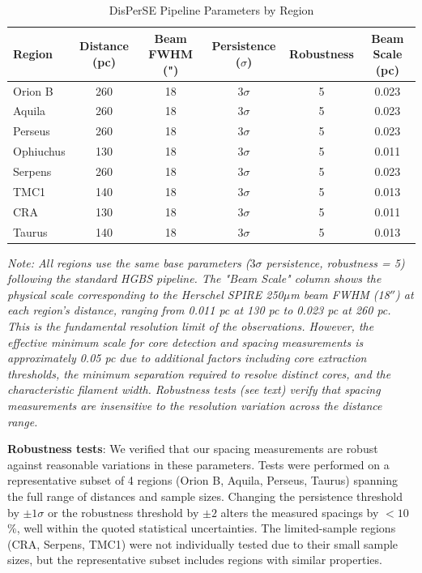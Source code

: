 \documentclass[11pt,a4paper]{article}
\begin{document}
\begin{table}[H]
\centering
\caption{DisPerSE Pipeline Parameters by Region}
\label{tab:disperse_params}
\small
\begin{tabular}{lccccc}
\toprule
Region & Distance (pc) & Beam FWHM (") & Persistence ($\sigma$) & Robustness & Beam Scale (pc) \\
\midrule
Orion B  & 260 & 18 & $3\sigma$ & 5 & 0.023 \\
Aquila   & 260 & 18 & $3\sigma$ & 5 & 0.023 \\
Perseus  & 260 & 18 & $3\sigma$ & 5 & 0.023 \\
Ophiuchus& 130 & 18 & $3\sigma$ & 5 & 0.011 \\
Serpens  & 260 & 18 & $3\sigma$ & 5 & 0.023 \\
TMC1     & 140 & 18 & $3\sigma$ & 5 & 0.013 \\
CRA      & 130 & 18 & $3\sigma$ & 5 & 0.011 \\
Taurus   & 140 & 18 & $3\sigma$ & 5 & 0.013 \\
\bottomrule
\end{tabular}
\vspace{-0.5em}
\small{\textit{Note: All regions use the same base parameters ($3\sigma$ persistence, robustness = 5) following the standard HGBS pipeline. The "Beam Scale" column shows the physical scale corresponding to the Herschel SPIRE 250$\mu$m beam FWHM (18$''$) at each region's distance, ranging from 0.011 pc at 130 pc to 0.023 pc at 260 pc. This is the fundamental resolution limit of the observations. However, the effective minimum scale for core detection and spacing measurements is approximately 0.05 pc due to additional factors including core extraction thresholds, the minimum separation required to resolve distinct cores, and the characteristic filament width. Robustness tests (see text) verify that spacing measurements are insensitive to the resolution variation across the distance range.}}
\end{table}

\textbf{Robustness tests}: We verified that our spacing measurements are robust against reasonable variations in these parameters. Tests were performed on a representative subset of 4 regions (Orion B, Aquila, Perseus, Taurus) spanning the full range of distances and sample sizes. Changing the persistence threshold by $\pm 1\sigma$ or the robustness threshold by $\pm 2$ alters the measured spacings by $<10$\%, well within the quoted statistical uncertainties. The limited-sample regions (CRA, Serpens, TMC1) were not individually tested due to their small sample sizes, but the representative subset includes regions with similar properties.
\end{document}
